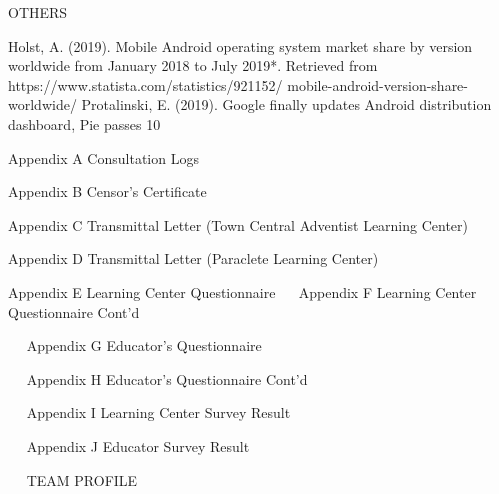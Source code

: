OTHERS

Holst, A. (2019).  Mobile Android operating system market share by version worldwide from January 2018 to July 2019*. Retrieved from https://www.statista.com/statistics/921152/ mobile-android-version-share-worldwide/ 
Protalinski, E. (2019). Google finally updates Android distribution dashboard, Pie passes 10%













Appendix A
Consultation Logs
 
 
Appendix B
Censor’s Certificate
     





Appendix C
Transmittal Letter (Town Central Adventist Learning Center)

 





Appendix D
Transmittal Letter (Paraclete Learning Center)
 
Appendix E
Learning Center Questionnaire
    
Appendix F
Learning Center Questionnaire Cont’d
 

 
Appendix G
Educator’s Questionnaire
   
 
Appendix H
Educator’s Questionnaire Cont’d
 
 
Appendix I
Learning Center Survey Result
  
 
Appendix J
Educator Survey Result
     
 
TEAM PROFILE
 






 


 
 


